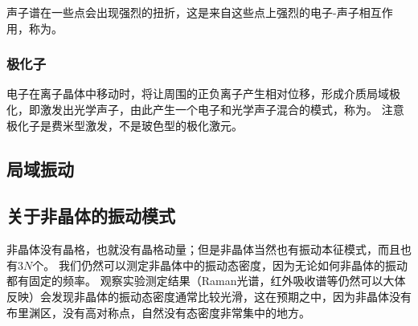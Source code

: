 声子谱在一些点会出现强烈的扭折，这是来自这些点上强烈的电子-声子相互作用，称为。

\subsubsection{极化子}

电子在离子晶体中移动时，将让周围的正负离子产生相对位移，形成介质局域极化，即激发出光学声子，由此产生一个电子和光学声子混合的模式，称为。
注意极化子是费米型激发，不是玻色型的极化激元。

\subsection{局域振动}

\subsection{关于非晶体的振动模式}

非晶体没有晶格，也就没有晶格动量；但是非晶体当然也有振动本征模式，而且也有$3N$个。
我们仍然可以测定非晶体中的振动态密度，因为无论如何非晶体的振动都有固定的频率。
观察实验测定结果（Raman光谱，红外吸收谱等仍然可以大体反映）会发现非晶体的振动态密度通常比较光滑，这在预期之中，因为非晶体没有布里渊区，没有高对称点，自然没有态密度非常集中的地方。